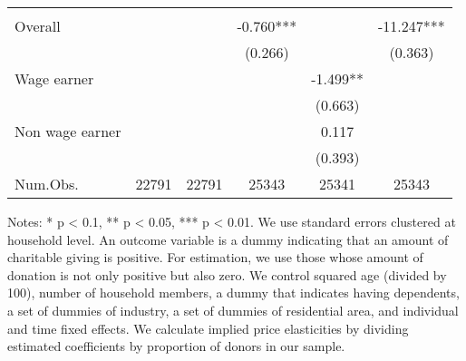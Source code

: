 \begin{table}
\begin{threeparttable}
\begin{tabular}[t]{lccccc}
\midrule
\addlinespace[0.3em]
\multicolumn{6}{l}{\textit{Implied price elasticity}}\\
\hspace{1em}Overall &  &  & -0.760*** &  & -11.247***\\
\hspace{1em} &  &  & (0.266) &  & (0.363)\\
\hspace{1em}Wage earner &  &  &  & -1.499** & \\
\hspace{1em} &  &  &  & (0.663) & \\
\hspace{1em}Non wage earner &  &  &  & 0.117 & \\
\hspace{1em} &  &  &  & (0.393) & \\
Num.Obs. & \num{22791} & \num{22791} & \num{25343} & \num{25341} & \num{25343}\\
\bottomrule
\end{tabular}
\begin{tablenotes}
\item Notes: * p < 0.1, ** p < 0.05, *** p < 0.01. We use standard errors clustered at household level. An outcome variable is a dummy indicating that an amount of charitable giving is positive. For estimation, we use those whose amount of donation is not only positive but also zero. We control squared age (divided by 100), number of household members, a dummy that indicates having dependents, a set of dummies of industry, a set of dummies of residential area, and individual and time fixed effects. We calculate implied price elasticities by dividing estimated coefficients by proportion of donors in our sample.
\end{tablenotes}
\end{threeparttable}
\end{table}
